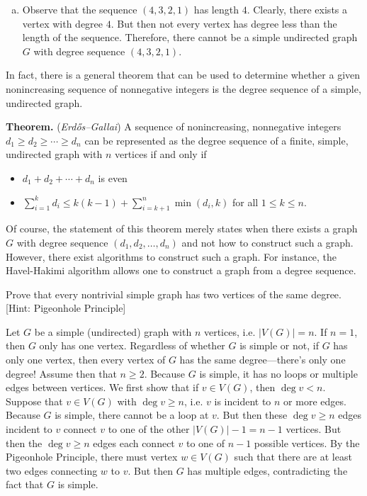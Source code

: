 \documentclass[11pt,letterpaper]{article}
\begin{document}
\begin{enumerate}[(a)]
\[\begin{tikzpicture}[scale=1.3]
	\path[line width=0.03cm] (a) edge node[below] {} (e);
	\path[line width=0.03cm] (b) edge node[below] {} (e);
	\path[line width=0.03cm] (c) edge node[below] {} (e);
	\path[line width=0.03cm] (d) edge node[below] {} (e);
	\end{tikzpicture}
	\] \pspace

\item Observe that the sequence $(4, 3, 2, 1)$ has length $4$. Clearly, there exists a vertex with degree $4$. But then not every vertex has degree less than the length of the sequence. Therefore, there cannot be a simple undirected graph $G$ with degree sequence $(4, 3, 2, 1)$. 
\end{enumerate} \pspace

In fact, there is a general theorem that can be used to determine whether a given nonincreasing sequence of nonnegative integers is the degree sequence of a simple, undirected graph. \pspace

{\bfseries Theorem.} ({\itshape Erd\H{o}s--Gallai}) A sequence of nonincreasing, nonnegative integers $d_1 \geq d_2 \geq \cdots \geq d_n$ can be represented as the degree sequence of a finite, simple, undirected graph with $n$ vertices if and only if 
	\begin{itemize}
	\item $d_1 + d_2 + \cdots + d_n$ is even
	\item $\displaystyle \sum_{i=1}^k d_i \leq k(k - 1) + \sum_{i=k+1}^n \min(d_i, k)$ for all $1 \leq k \leq n$.
	\end{itemize}

Of course, the statement of this theorem merely states when there exists a graph $G$ with degree sequence $(d_1, d_2, \ldots, d_n)$ and not how to construct such a graph. However, there exist algorithms to construct such a graph. For instance, the Havel-Hakimi algorithm allows one to construct a graph from a degree sequence. 



\newpage



 Prove that every nontrivial simple graph has two vertices of the same degree. [Hint: Pigeonhole Principle] \pspace

\sol Let $G$ be a simple (undirected) graph with $n$ vertices, i.e. $|V(G)|= n$. If $n= 1$, then $G$ only has one vertex. Regardless of whether $G$ is simple or not, if $G$ has only one vertex, then every vertex of $G$ has the same degree---there's only one degree! Assume then that $n \geq 2$. Because $G$ is simple, it has no loops or multiple edges between vertices. We first show that if $v \in V(G)$, then $\deg v < n$. Suppose that $v \in V(G)$ with $\deg v \geq n$, i.e. $v$ is incident to $n$ or more edges. Because $G$ is simple, there cannot be a loop at $v$. But then these $\deg v \geq n$ edges incident to $v$ connect $v$ to one of the other $|V(G)| - 1= n - 1$ vertices. But then the $\deg v \geq n$ edges each connect $v$ to one of $n - 1$ possible vertices. By the Pigeonhole Principle, there must vertex $w \in V(G)$ such that there are at least two edges connecting $w$ to $v$. But then $G$ has multiple edges, contradicting the fact that $G$ is simple. \pspace
\end{document}
